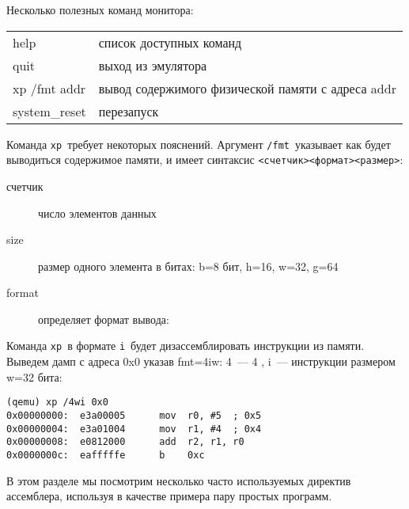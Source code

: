 
Несколько полезных команд монитора:

\begin{tabular}{l l}
help & список доступных команд \\
quit & выход из эмулятора \\
xp /fmt addr & вывод содержимого физической памяти с адреса addr \\
system\_reset & перезапуск \\
\end{tabular}
\bigskip

Команда \verb|xp|\ требует некоторых пояснений. Аргумент \verb|/fmt|\ указывает
как будет выводиться содержимое памяти, и имеет синтаксис
\verb|<счетчик><формат><размер>|:

\begin{description}
\item[счетчик] число элементов данных
\item[size] размер одного элемента в битах: b=8 бит, h=16, w=32, g=64
\item[format] определяет формат вывода:
\end{description}

Команда \verb|xp|\ в формате \verb|i|\ будет дизассемблировать инструкции из
памяти. Выведем дамп с адреса 0x0 указав fmt=4iw: 4\ --- 4 , i\ ---
инструкции размером w=32 бита:

\begin{verbatim}
(qemu) xp /4wi 0x0
0x00000000:  e3a00005      mov  r0, #5  ; 0x5
0x00000004:  e3a01004      mov  r1, #4  ; 0x4
0x00000008:  e0812000      add  r2, r1, r0
0x0000000c:  eafffffe      b    0xc
\end{verbatim}

\secup
{}\secdown

В этом разделе мы посмотрим несколько часто используемых директив ассемблера,
используя в качестве примера пару простых программ.

